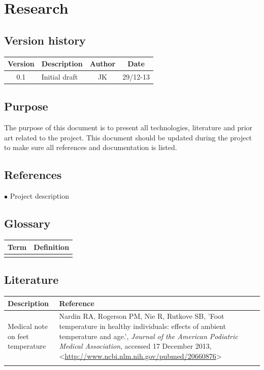 \chapter{Research}
\section{Version history}
\begin{table}[H]
\begin{tabular}{|c|p{9cm}|c|c|}
\hline
Version & Description & Author & Date\\
\hline
0.1 & Initial draft & JK & 29/12-13\\
\hline
\end{tabular}
\end{table}

\section{Purpose}
The purpose of this document is to present all technologies, literature and prior art related to the project. This document should be updated during the project to make sure all references and documentation is listed.

\section{References}
$\bullet$ Project description

\section{Glossary}
\begin{table}[H]
\centering
\begin{tabular}{|p{4cm}|p{7cm}|}
\hline
Term & Definition\\ \hline
&\\ \hline
\end{tabular}
\end{table}

\section{Literature}


\begin{table}[H]
\centering
\begin{tabular}{|p{4cm}|p{10cm}|}
\hline
Description & Reference\\ \hline
Medical note on feet temperature&Nardin RA, Rogerson PM, Nie R, Rutkove SB, 'Foot temperature in healthy individuals: effects of ambient temperature and age.', \textit{Journal of the American Podiatric Medical Association}, accessed 17 December 2013, <\url{http://www.ncbi.nlm.nih.gov/pubmed/20660876}>\\ \hline
& \\ \hline
\end{tabular}
\end{table}

